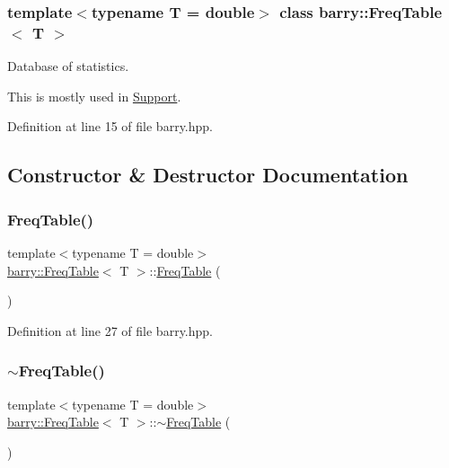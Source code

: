 \subsubsection*{template$<$typename T = double$>$\newline
class barry\+::\+Freq\+Table$<$ T $>$}

Database of statistics. 

This is mostly used in {\ttfamily \hyperlink{classbarry_1_1_support}{Support}}. 

Definition at line 15 of file barry.\+hpp.



\subsection{Constructor \& Destructor Documentation}
\mbox{\label{classbarry_1_1_freq_table_aea4b22f8097950c3d78e81ab2ed38ae1}} 
\subsubsection{\texorpdfstring{Freq\+Table()}{FreqTable()}}
{\footnotesize\ttfamily template$<$typename T  = double$>$ \\
\hyperlink{classbarry_1_1_freq_table}{barry\+::\+Freq\+Table}$<$ T $>$\+::\hyperlink{classbarry_1_1_freq_table}{Freq\+Table} (\begin{DoxyParamCaption}{ }\end{DoxyParamCaption})\hspace{0.3cm}{\ttfamily [inline]}}



Definition at line 27 of file barry.\+hpp.

\mbox{\label{classbarry_1_1_freq_table_a420a7e4e6740ed7f2b0db1a238f53713}} 
\subsubsection{\texorpdfstring{$\sim$\+Freq\+Table()}{~FreqTable()}}
{\footnotesize\ttfamily template$<$typename T  = double$>$ \\
\hyperlink{classbarry_1_1_freq_table}{barry\+::\+Freq\+Table}$<$ T $>$\+::$\sim$\hyperlink{classbarry_1_1_freq_table}{Freq\+Table} (\begin{DoxyParamCaption}{ }\end{DoxyParamCaption})\hspace{0.3cm}{\ttfamily [inline]}}



